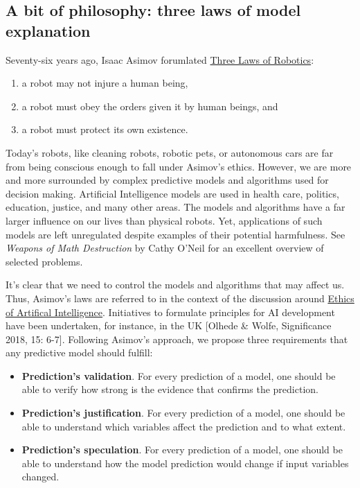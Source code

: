 \documentclass[12pt,]{krantz}
\providecommand{\tightlist}{%
  \setlength{\itemsep}{0pt}\setlength{\parskip}{0pt}}
\begin{document}
\hypertarget{three-single-laws}{%
\subsection{A bit of philosophy: three laws of model explanation}\label{three-single-laws}}

Seventy-six years ago, Isaac Asimov forumlated \href{https://en.wikipedia.org/wiki/Three_Laws_of_Robotics}{Three Laws of Robotics}:

\begin{enumerate}
\def\labelenumi{\arabic{enumi})}
\tightlist
\item
  a robot may not injure a human being,
\item
  a robot must obey the orders given it by human beings, and
\item
  a robot must protect its own existence.
\end{enumerate}

Today's robots, like cleaning robots, robotic pets, or autonomous cars are far from being conscious enough to fall under Asimov's ethics. However, we are more and more surrounded by complex predictive models and algorithms used for decision making. Artificial Intelligence models are used in health care, politics, education, justice, and many other areas. The models and algorithms have a far larger influence on our lives than physical robots. Yet, applications of such models are left unregulated despite examples of their potential harmfulness. See \emph{Weapons of Math Destruction} by Cathy O'Neil \citep{ONeil} for an excellent overview of selected problems.

It's clear that we need to control the models and algorithms that may affect us. Thus, Asimov's laws are referred to in the context of the discussion around \href{https://en.wikipedia.org/wiki/Ethics_of_artificial_intelligence}{Ethics of Artifical Intelligence}. Initiatives to formulate principles for AI development have been undertaken, for instance, in the UK {[}Olhede \& Wolfe, Significance 2018, 15: 6-7{]}. Following Asimov's approach, we propose three requirements that any predictive model should fulfill:

\begin{itemize}
\tightlist
\item
  \textbf{Prediction's validation}. For every prediction of a model, one should be able to verify how strong is the evidence that confirms the prediction.
\item
  \textbf{Prediction's justification}. For every prediction of a model, one should be able to understand which variables affect the prediction and to what extent.
\item
  \textbf{Prediction's speculation}. For every prediction of a model, one should be able to understand how the model prediction would change if input variables changed.
\end{itemize}
\end{document}
